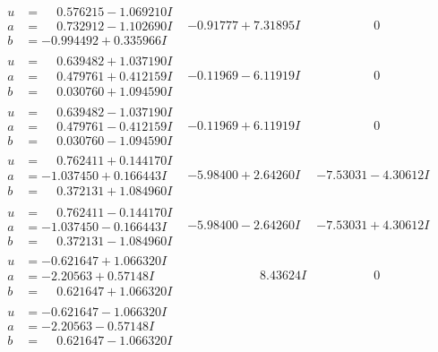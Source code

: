 \documentclass[1p]{elsarticle_modified}
\theoremstyle{definition}
\begin{document}
$$\begin{array}{c|c|c}
\begin{aligned}
u &= \phantom{-}0.576215 - 1.069210 I \\
a &= \phantom{-}0.732912 - 1.102690 I \\
b &= -0.994492 + 0.335966 I\end{aligned}
 & -0.91777 + 7.31895 I & \phantom{-0.000000 } 0 \\ \hline\begin{aligned}
u &= \phantom{-}0.639482 + 1.037190 I \\
a &= \phantom{-}0.479761 + 0.412159 I \\
b &= \phantom{-}0.030760 + 1.094590 I\end{aligned}
 & -0.11969 - 6.11919 I & \phantom{-0.000000 } 0 \\ \hline\begin{aligned}
u &= \phantom{-}0.639482 - 1.037190 I \\
a &= \phantom{-}0.479761 - 0.412159 I \\
b &= \phantom{-}0.030760 - 1.094590 I\end{aligned}
 & -0.11969 + 6.11919 I & \phantom{-0.000000 } 0 \\ \hline\begin{aligned}
u &= \phantom{-}0.762411 + 0.144170 I \\
a &= -1.037450 + 0.166443 I \\
b &= \phantom{-}0.372131 + 1.084960 I\end{aligned}
 & -5.98400 + 2.64260 I & -7.53031 - 4.30612 I \\ \hline\begin{aligned}
u &= \phantom{-}0.762411 - 0.144170 I \\
a &= -1.037450 - 0.166443 I \\
b &= \phantom{-}0.372131 - 1.084960 I\end{aligned}
 & -5.98400 - 2.64260 I & -7.53031 + 4.30612 I \\ \hline\begin{aligned}
u &= -0.621647 + 1.066320 I \\
a &= -2.20563 + 0.57148 I \\
b &= \phantom{-}0.621647 + 1.066320 I\end{aligned}
 & \phantom{-0.000000 -}8.43624 I & \phantom{-0.000000 } 0 \\ \hline\begin{aligned}
u &= -0.621647 - 1.066320 I \\
a &= -2.20563 - 0.57148 I \\
b &= \phantom{-}0.621647 - 1.066320 I\end{aligned}

\end{array}$$
\end{document}
